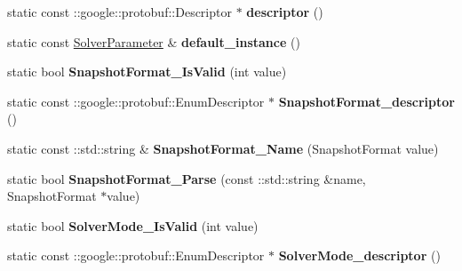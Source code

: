 \begin{DoxyCompactItemize}
\item 
\mbox{\label{classcaffe_1_1_solver_parameter_a010251956b194270ead641441c8c58dd}} 
static const \+::google\+::protobuf\+::\+Descriptor $\ast$ {\bfseries descriptor} ()
\item 
\mbox{\label{classcaffe_1_1_solver_parameter_a97e209ea6954bf9368ad56041f7eaf58}} 
static const \mbox{\hyperlink{classcaffe_1_1_solver_parameter}{Solver\+Parameter}} \& {\bfseries default\+\_\+instance} ()
\item 
\mbox{\label{classcaffe_1_1_solver_parameter_abbe9d4547c8c933385f4925894379225}} 
static bool {\bfseries Snapshot\+Format\+\_\+\+Is\+Valid} (int value)
\item 
\mbox{\label{classcaffe_1_1_solver_parameter_a6aa99b19a8b9f4e08388b967eab1a90a}} 
static const \+::google\+::protobuf\+::\+Enum\+Descriptor $\ast$ {\bfseries Snapshot\+Format\+\_\+descriptor} ()
\item 
\mbox{\label{classcaffe_1_1_solver_parameter_a10226c8a375be9c14396d2ed6d70f8e8}} 
static const \+::std\+::string \& {\bfseries Snapshot\+Format\+\_\+\+Name} (Snapshot\+Format value)
\item 
\mbox{\label{classcaffe_1_1_solver_parameter_a8d7cee695c2204fad639fbeede1694ea}} 
static bool {\bfseries Snapshot\+Format\+\_\+\+Parse} (const \+::std\+::string \&name, Snapshot\+Format $\ast$value)
\item 
\mbox{\label{classcaffe_1_1_solver_parameter_accc886759efd0c26b86bdfd16019c86c}} 
static bool {\bfseries Solver\+Mode\+\_\+\+Is\+Valid} (int value)
\item 
\mbox{\label{classcaffe_1_1_solver_parameter_ab56fe719df1f48ca3ac3bdce9ee86b4e}} 
static const \+::google\+::protobuf\+::\+Enum\+Descriptor $\ast$ {\bfseries Solver\+Mode\+\_\+descriptor} ()
\item 
\mbox{\label{classcaffe_1_1_solver_parameter_a7d169f733f8bda0772027eff701156f7}} 

\end{DoxyCompactItemize}
